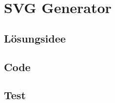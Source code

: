 \documentclass[german,notitlepage,smartquotes]{hgbreport}
\begin{document}

\section{SVG Generator}

\subsection{Lösungsidee}
\subsection{Code}
\subsection{Test}






\end{document}
